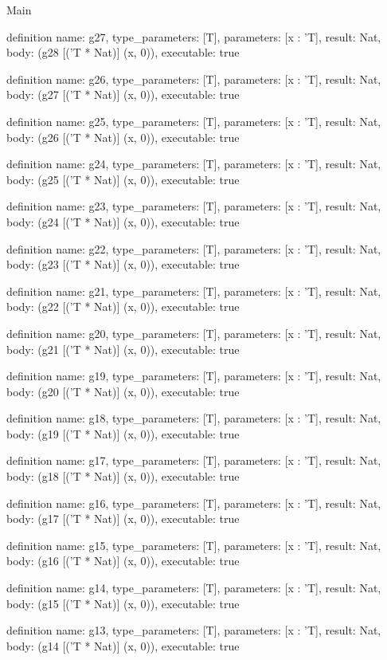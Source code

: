 \begin{lexlean}{Main}
\begin{semanticmodule}
definition{
  name: g27,
  type_parameters: [T],
  parameters: [x : 'T],
  result: Nat,
  body: (g28 [('T * Nat)] (x, 0)),
  executable: true
}

definition{
  name: g26,
  type_parameters: [T],
  parameters: [x : 'T],
  result: Nat,
  body: (g27 [('T * Nat)] (x, 0)),
  executable: true
}

definition{
  name: g25,
  type_parameters: [T],
  parameters: [x : 'T],
  result: Nat,
  body: (g26 [('T * Nat)] (x, 0)),
  executable: true
}

definition{
  name: g24,
  type_parameters: [T],
  parameters: [x : 'T],
  result: Nat,
  body: (g25 [('T * Nat)] (x, 0)),
  executable: true
}

definition{
  name: g23,
  type_parameters: [T],
  parameters: [x : 'T],
  result: Nat,
  body: (g24 [('T * Nat)] (x, 0)),
  executable: true
}

definition{
  name: g22,
  type_parameters: [T],
  parameters: [x : 'T],
  result: Nat,
  body: (g23 [('T * Nat)] (x, 0)),
  executable: true
}

definition{
  name: g21,
  type_parameters: [T],
  parameters: [x : 'T],
  result: Nat,
  body: (g22 [('T * Nat)] (x, 0)),
  executable: true
}

definition{
  name: g20,
  type_parameters: [T],
  parameters: [x : 'T],
  result: Nat,
  body: (g21 [('T * Nat)] (x, 0)),
  executable: true
}

definition{
  name: g19,
  type_parameters: [T],
  parameters: [x : 'T],
  result: Nat,
  body: (g20 [('T * Nat)] (x, 0)),
  executable: true
}

definition{
  name: g18,
  type_parameters: [T],
  parameters: [x : 'T],
  result: Nat,
  body: (g19 [('T * Nat)] (x, 0)),
  executable: true
}

definition{
  name: g17,
  type_parameters: [T],
  parameters: [x : 'T],
  result: Nat,
  body: (g18 [('T * Nat)] (x, 0)),
  executable: true
}

definition{
  name: g16,
  type_parameters: [T],
  parameters: [x : 'T],
  result: Nat,
  body: (g17 [('T * Nat)] (x, 0)),
  executable: true
}

definition{
  name: g15,
  type_parameters: [T],
  parameters: [x : 'T],
  result: Nat,
  body: (g16 [('T * Nat)] (x, 0)),
  executable: true
}

definition{
  name: g14,
  type_parameters: [T],
  parameters: [x : 'T],
  result: Nat,
  body: (g15 [('T * Nat)] (x, 0)),
  executable: true
}

definition{
  name: g13,
  type_parameters: [T],
  parameters: [x : 'T],
  result: Nat,
  body: (g14 [('T * Nat)] (x, 0)),
  executable: true
}


\end{semanticmodule}
\end{lexlean}
